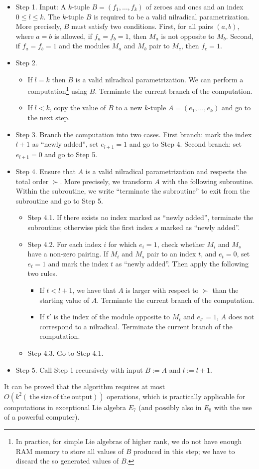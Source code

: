 \documentclass[12pt]{report}
\begin{document}
\begin{itemize}
\item Step 1. Input: A $k$-tuple $B=(f_1,\dots, f_k)$ of zeroes and ones and an index $0\leq l\leq k$. The $k$-tuple $B$ is required to be a valid nilradical parametrization. More precisely, $B$ must satisfy two conditions. First, for all pairs $(a,b)$, where $a=b$ is allowed, if $f_a=f_b=1$, then $M_a$ is not opposite to $M_b$. Second, if $f_a=f_b=1$ and the modules $M_a$ and $M_b$ pair to $M_c$, then $f_c=1$.
\item Step 2. 
\begin{itemize}
\item If $l=k$ then $B$ is a valid nilradical parametrization. We can perform a computation\footnote{ In practice, for simple Lie algebras of higher rank, we do not have enough RAM memory to store all values of $B$ produced in this step; we have to discard the so generated values of $B$.} using $B$. Terminate the current branch of the computation.
\item  If $l<k$, copy the value of $B$ to a new $k$-tuple $A=(e_1,\dots, e_k)$ and go to the next step.
\end{itemize}
\item Step 3. Branch the computation into two cases. First branch: mark the index $l+1$ as ``newly added'', set $e_{l+1}=1$ and go to Step 4. Second branch: set $e_{l+1}=0$ and go to Step 5.
\item Step 4. Ensure that $A$ is a valid nilradical parametrization and respects the total order $\succ$. More precisely, we transform $A$ with the following subroutine. Within the subroutine, we write ``terminate the subroutine'' to exit from the subroutine and go to Step 5.
\begin{itemize}
\item Step 4.1. If there exists no index marked as ``newly added'', terminate the subroutine; otherwise pick the first index $s$ marked as ``newly added''.
\item Step 4.2. For each index $i$ for which $e_i=1$, check whether $M_i$ and $M_s$ have a non-zero pairing. If $M_i$ and $M_s$ pair to an index $t$, and $e_t=0$, set $e_t=1$ and mark the index $t$ as ``newly added''. Then apply the following two rules.
\begin{itemize}
\item If $t<l+1$, we have that $A$ is larger with respect to $\succ$ than the starting value of $A$. Terminate the current branch of the computation. 
\item If $t'$ is the index of the module opposite to $M_t$ and $e_{t'}=1$, $A$ does not correspond to a nilradical. Terminate the current branch of the computation.
\end{itemize}
\item Step 4.3. Go to Step 4.1.
\end{itemize}
\item Step 5. Call Step 1 recursively with input $B:=A$ and $l:=l+1$.
\end{itemize}
It can be proved that the algorithm requires at most $O(k^2(\mathrm{~the~size~of~the~output}))$ operations, which is practically applicable for computations in exceptional Lie algebra $E_7$ (and possibly also in $E_8$ with the use of a powerful computer).
\end{document}
